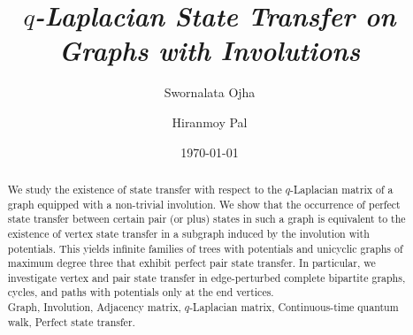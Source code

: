 \documentclass[12pt,a4paper]{article}
\title{\it $q$-Laplacian State Transfer on Graphs with Involutions}
\author[1]{Swornalata Ojha}
\author[2]{Hiranmoy Pal}
\affil[1,2]{Department of Mathematics, National Institute of Technology Rourkela, India-769008.}
\date{\today}
\begin{document}
\maketitle




\begin{abstract}

We study the existence of state transfer with respect to the $q$-Laplacian matrix of a graph equipped with a non-trivial involution. We show that the occurrence of perfect state transfer between certain pair (or plus) states in such a graph is equivalent to the existence of vertex state transfer in a subgraph induced by the involution with potentials. This yields infinite families of trees with potentials and unicyclic graphs of maximum degree three that exhibit perfect pair state transfer. In particular, we investigate vertex and pair state transfer in edge-perturbed complete bipartite graphs, cycles, and paths with potentials only at the end vertices.\\

 Graph, Involution, Adjacency matrix, $q$-Laplacian matrix, Continuous-time quantum walk,  Perfect state transfer.\\

\end{abstract}


\newpage
\end{document}
